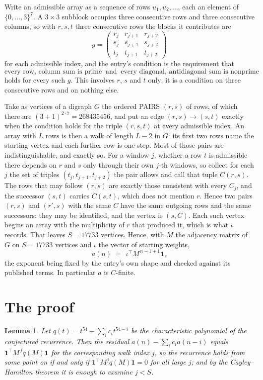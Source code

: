 \documentclass[11pt,a4paper]{article}
\theoremstyle{plain}
\newtheorem{lemma}[theorem]{Lemma}
\theoremstyle{definition}
\begin{document}
Write an admissible array as a sequence of rows $u_1,u_2,\dots$, each an element of
$\{0,\dots,3\}^{7}$. A $3\times3$ subblock occupies three consecutive rows and
three consecutive columns, so with $r,s,t$ three consecutive rows the blocks it
contributes are
\[
g=\begin{pmatrix}r_j&r_{j+1}&r_{j+2}\\ s_j&s_{j+1}&s_{j+2}\\ t_j&t_{j+1}&t_{j+2}\end{pmatrix}
\]
for each admissible index, and the entry's condition is the requirement that
\[
\text{every row, column sum is prime}\ \text{ and }\ \text{every diagonal, antidiagonal sum is nonprime}
\]
holds for every such $g$. This involves $r$, $s$ and $t$ only: it is a condition on
three consecutive rows and on nothing else.

Take as vertices of a digraph $G$ the ordered PAIRS $(r,s)$ of rows, of which there are
$(3+1)^{2\cdot7}=268435456$, and put an edge $(r,s)\to(s,t)$ exactly when the condition
holds for the triple $(r,s,t)$ at every admissible index. An array with $L$ rows is then a
walk of length $L-2$ in $G$: its first two rows name the starting vertex and each further
row is one step. Most of those pairs are indistinguishable, and exactly so. For a window $j$, whether a row $t$ is admissible there depends on $r$ and $s$ only through their own $j$-th windows, so collect for each $j$ the set of triples $(t_j,t_{j+1},t_{j+2})$ the pair allows and call that tuple $C(r,s)$. The rows that may follow $(r,s)$ are exactly those consistent with every $C_j$, and the successor $(s,t)$ carries $C(s,t)$, which does not mention $r$. Hence two pairs $(r,s)$ and $(r',s)$ with the same $C$ have the same outgoing rows and the same successors: they may be identified, and the vertex is $(s,C)$. Each such vertex begins an array with the multiplicity of $r$ that produced it, which is what $\iota$ records. That leaves $S=17733$ vertices. Hence, with $M$ the adjacency matrix of $G$ on $S=17733$ vertices and
$\iota$ the vector of starting weights,
\[
a(n)\;=\;\,\iota^{\!\top}M^{\,n-1+1}\mathbf{1},
\]
the exponent being fixed by the entry's own shape and checked against its published terms.
In particular $a$ is $C$-finite.

\section{The proof}

\begin{lemma}\label{lem:crit}
Let $q(t)=t^{54}-\sum_i c_it^{54-i}$ be the characteristic polynomial of the
conjectured recurrence. Then the residual $a(n)-\sum_ic_ia(n-i)$ equals
$\mathbf{1}^{\!\top}M^{\,j}q(M)\mathbf{1}$ for the corresponding walk index
$j$, so the recurrence holds from some point on if and only if
$\mathbf{1}^{\!\top}M^{j}q(M)\mathbf{1}=0$ for all large $j$; and by the
Cayley--Hamilton theorem it is enough to examine $j<S$.
\end{lemma}
\end{document}
